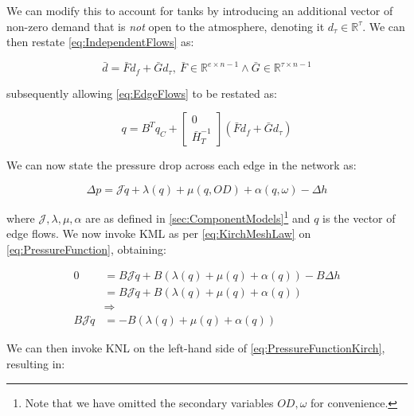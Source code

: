 We can modify this to account for tanks by introducing an additional vector of non-zero demand that is \textit{not} open to the atmosphere, denoting it $d_{\tau} \in \mathbb{R}^{\tau}$. We can then restate \cref{eq:IndependentFlows} as:

\begin{equation}\label{eq:IndependentFlowsWithTank}
	\bar{d} = \bar{F} d_f + \bar{G} d_{\tau}, 
	\ \bar{F} \in \mathbb{R}^{e \times n-1}
	\wedge 
	\bar{G} \in \mathbb{R}^{\tau \times n-1}
\end{equation}

subsequently allowing \cref{eq:EdgeFlows} to be restated as:

\begin{equation}\label{eq:EdgeFlowsWithTank}
	q = B^T q_C +
	\begin{bmatrix} 0 \\ \bar{H}_T^{-1} \end{bmatrix} (\bar{F} d_f + \bar{G} d_{\tau})
\end{equation}

We can now state the pressure drop across each edge in the network as:

\begin{equation}\label{eq:PressureFunction}
	\Delta p = \mathcal{J}\dot{q} + \lambda(q) + \mu(q, OD) + \alpha(q, \omega) -\Delta h
\end{equation}

where $\mathcal{J}, \lambda, \mu, \alpha$ are as defined in \cref{sec:ComponentModels}\footnote{Note that we have omitted the secondary variables $OD,\omega$ for convenience.} and $q$ is the vector of edge flows. We now invoke KML as per \cref{eq:KirchMeshLaw} on \cref{eq:PressureFunction}, obtaining:

\begin{equation}\label{eq:PressureFunctionKirch}
	\begin{split}
			0 &= B\mathcal{J}\dot{q} + B(\lambda(q) + \mu(q) + \alpha(q)) -B\Delta h \\
			&= B\mathcal{J}\dot{q} + B(\lambda(q) + \mu(q) + \alpha(q)) \\
			&\Rightarrow \\
			B\mathcal{J}\dot{q} &= -B(\lambda(q) + \mu(q) + \alpha(q))
	\end{split}
\end{equation}

We can then invoke KNL on the left-hand side of \cref{eq:PressureFunctionKirch}, resulting in:

